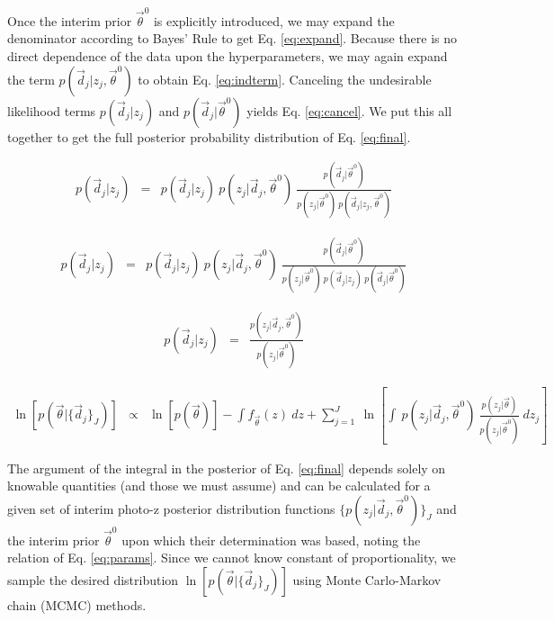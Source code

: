 \documentclass[preprint]{aastex}
\begin{document}
Once the interim prior $\vec{\theta}^{0}$ is explicitly introduced, we may 
expand the denominator according to Bayes' Rule to get Eq. \ref{eq:expand}.  
Because there is no direct dependence of the data upon the hyperparameters, we 
may again expand the term $p(\vec{d}_{j}|z_{j},\vec{\theta}^{0})$ to obtain Eq. 
\ref{eq:indterm}.  Canceling the undesirable likelihood terms 
$p(\vec{d}_{j}|z_{j})$ and $p(\vec{d}_{j}|\vec{\theta}^{0})$ yields Eq. 
\ref{eq:cancel}.  We put this all together to get the full posterior 
probability distribution of Eq. \ref{eq:final}.

\begin{eqnarray}
\label{eq:expand}
p(\vec{d}_{j}|z_{j}) &=& p(\vec{d}_{j}|z_{j})\ 
p(z_{j}|\vec{d}_{j},\vec{\theta}^{0})\ 
\frac{p(\vec{d}_{j}|\vec{\theta}^{0})}{p(z_{j}|\vec{\theta}^{0})\ 
p(\vec{d}_{j}|z_{j},\vec{\theta}^{0})}
\end{eqnarray}

\begin{eqnarray}
\label{eq:indterm}
p(\vec{d}_{j}|z_{j}) &=& p(\vec{d}_{j}|z_{j})\ 
p(z_{j}|\vec{d}_{j},\vec{\theta}^{0})\ 
\frac{p(\vec{d}_{j}|\vec{\theta}^{0})}{p(z_{j}|\vec{\theta}^{0})\ 
p(\vec{d}_{j}|z_{j})\ p(\vec{d}_{j}|\vec{\theta}^{0})}
\end{eqnarray}

\begin{eqnarray}
\label{eq:cancel}
p(\vec{d}_{j}|z_{j}) &=& 
\frac{p(z_{j}|\vec{d}_{j},\vec{\theta}^{0})}{p(z_{j}|\vec{\theta}^{0})}
\end{eqnarray}

\begin{eqnarray}
\label{eq:final}
\ln[p(\vec{\theta}|\{\vec{d}_{j}\}_{J})] &\propto& \ln[p(\vec{\theta})]-\int 
f_{\vec{\theta}}(z)\ dz + \sum_{j=1}^{J}\ \ln\left[\int\ 
p(z_{j}|\vec{d}_{j},\vec{\theta}^{0})\ 
\frac{p(z_{j}|\vec{\theta})}{p(z_{j}|\vec{\theta}^{0})}\ dz_{j}\right]
\end{eqnarray}

The argument of the integral in the posterior of Eq. \ref{eq:final} depends 
solely on knowable quantities (and those we must assume) and can be calculated 
for a given set of interim photo-z posterior distribution functions 
$\{p(z_{j}|\vec{d}_{j},\vec{\theta}^{0})\}_{J}$ and the interim prior 
$\vec{\theta}^{0}$ upon which their determination was based, noting the 
relation of Eq. \ref{eq:params}.  Since we cannot know constant of 
proportionality, we sample the desired distribution 
$\ln[p(\vec{\theta}|\{\vec{d}_{j}\}_{J})]$ using Monte Carlo-Markov chain 
(MCMC) methods.  
\end{document}
